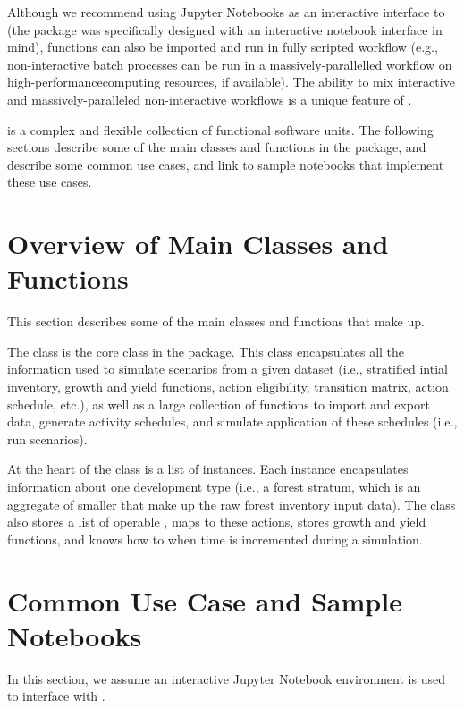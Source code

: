 \documentclass[letterpaper,10pt,english]{sphinxmanual}
\begin{document}
Although we recommend using Jupyter Notebooks as an interactive interface to  (the package was specifically designed with an interactive notebook interface in mind),  functions can also be imported and run in fully scripted workflow (e.g., non-interactive batch processes can be run in a massively-parallelled workflow on high-performance\textendash{}computing resources, if available). The ability to mix interactive and massively-paralleled non-interactive workflows is a unique feature of .

 is a complex and flexible collection of functional software units. The following sections describe some of the main classes and functions in the package, and describe some common use cases, and link to sample notebooks that implement these use cases.


\section{Overview of Main Classes and Functions}
\label{\detokenize{intro:overview-of-main-classes-and-functions}}
This section describes some of the main classes and functions that make up.

The  class is the core class in the package. This class encapsulates all the information used to simulate scenarios from a given dataset (i.e., stratified intial inventory, growth and yield functions, action eligibility, transition matrix, action schedule, etc.), as well as a large collection of functions to import and export data, generate activity schedules, and simulate application of these schedules  (i.e., run scenarios).

At the heart of the  class is a list of  instances. Each  instance encapsulates information about one development type (i.e., a forest stratum, which is an aggregate of smaller  that make up the raw forest inventory input data). The  class also stores a list of operable , maps  to these actions, stores growth and yield functions, and knows how to  when time is incremented during a simulation.


\section{Common Use Case and Sample Notebooks}
\label{\detokenize{intro:common-use-case-and-sample-notebooks}}
In this section, we assume an interactive Jupyter Notebook environment is used to interface with .
\end{document}
